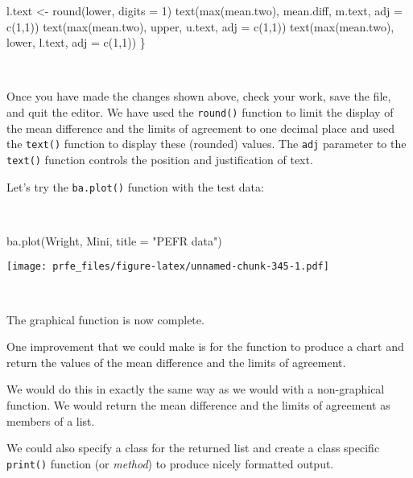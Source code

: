 \documentclass[
  12pt,
  a4paper]{book}
\newenvironment{Shaded}{\begin{snugshade}}{\end{snugshade}}
\newcommand{\AttributeTok}[1]{\textcolor[rgb]{0.77,0.63,0.00}{#1}}
\newcommand{\DecValTok}[1]{\textcolor[rgb]{0.00,0.00,0.81}{#1}}
\newcommand{\FunctionTok}[1]{\textcolor[rgb]{0.00,0.00,0.00}{#1}}
\newcommand{\NormalTok}[1]{#1}
\newcommand{\OtherTok}[1]{\textcolor[rgb]{0.56,0.35,0.01}{#1}}
\newcommand{\StringTok}[1]{\textcolor[rgb]{0.31,0.60,0.02}{#1}}
\begin{document}
\begin{Shaded}
\begin{Highlighting}[]
\NormalTok{  l.text }\OtherTok{\textless{}{-}} \FunctionTok{round}\NormalTok{(lower, }\AttributeTok{digits =} \DecValTok{1}\NormalTok{)}
  \FunctionTok{text}\NormalTok{(}\FunctionTok{max}\NormalTok{(mean.two), mean.diff, m.text, }\AttributeTok{adj =} \FunctionTok{c}\NormalTok{(}\DecValTok{1}\NormalTok{,}\DecValTok{1}\NormalTok{)) }
  \FunctionTok{text}\NormalTok{(}\FunctionTok{max}\NormalTok{(mean.two), upper, u.text, }\AttributeTok{adj =} \FunctionTok{c}\NormalTok{(}\DecValTok{1}\NormalTok{,}\DecValTok{1}\NormalTok{)) }
  \FunctionTok{text}\NormalTok{(}\FunctionTok{max}\NormalTok{(mean.two), lower, l.text, }\AttributeTok{adj =} \FunctionTok{c}\NormalTok{(}\DecValTok{1}\NormalTok{,}\DecValTok{1}\NormalTok{))}
\NormalTok{\}}
\end{Highlighting}
\end{Shaded}

~

Once you have made the changes shown above, check your work, save the file, and quit the editor.
We have used the \texttt{round()} function to limit the display of the mean difference and the limits of agreement to one decimal place and used the \texttt{text()} function to display these (rounded) values. The \texttt{adj} parameter to the \texttt{text()} function controls the position and justification of text.

Let's try the \texttt{ba.plot()} function with the test data:

~

\begin{Shaded}
\begin{Highlighting}[]
\FunctionTok{ba.plot}\NormalTok{(Wright, Mini, }\AttributeTok{title =} \StringTok{"PEFR data"}\NormalTok{)}
\end{Highlighting}
\end{Shaded}

\texttt{[image: prfe\_files/figure-latex/unnamed-chunk-345-1.pdf]}

~

The graphical function is now complete.

One improvement that we could make is for the function to produce a chart and return the values of the mean difference and the limits of agreement.

We would do this in exactly the same way as we would with a non-graphical function. We would return the mean difference and the limits of agreement as members of a list.

We could also specify a class for the returned list and create a class specific \texttt{print()} function (or \emph{method}) to produce nicely formatted output.
\end{document}
